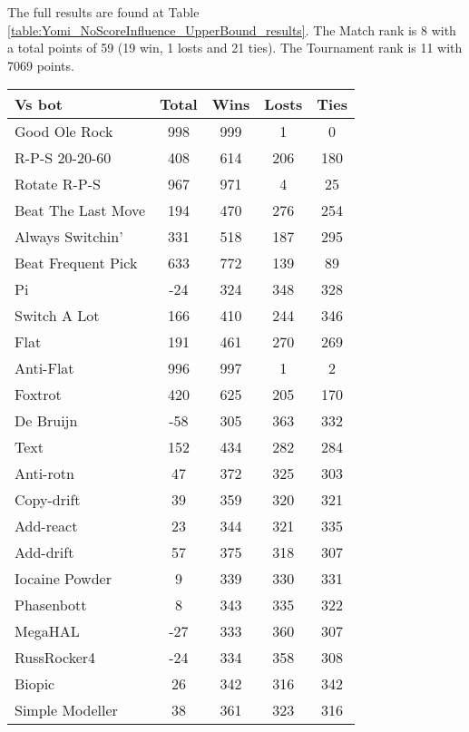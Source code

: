 The full results are found at Table \ref{table:Yomi_NoScoreInfluence_UpperBound_results}. The Match rank is 8 with a total points of 59 (19 win, 1 losts and 21 ties). The Tournament rank is 11 with 7069 points.

\begin{table*}
    \caption{Yomi No Score Influence Upper Bound results}
    \label{table:Yomi_NoScoreInfluence_UpperBound_results}
    \centering
    \begin{tabular}{|l|c|c|c|c|}
        \hline
        \textbf{Vs bot} & \textbf{Total} & \textbf{Wins} & \textbf{Losts} & \textbf{Ties} \\ \hline
Good Ole Rock & 998 & 999 & 1 & 0 \\ \hline 
R-P-S 20-20-60 & 408 & 614 & 206 & 180 \\ \hline 
Rotate R-P-S & 967 & 971 & 4 & 25 \\ \hline 
Beat The Last Move & 194 & 470 & 276 & 254 \\ \hline 
Always Switchin' & 331 & 518 & 187 & 295 \\ \hline 
Beat Frequent Pick & 633 & 772 & 139 & 89 \\ \hline 
Pi & -24 & 324 & 348 & 328 \\ \hline 
Switch A Lot & 166 & 410 & 244 & 346 \\ \hline 
Flat & 191 & 461 & 270 & 269 \\ \hline 
Anti-Flat & 996 & 997 & 1 & 2 \\ \hline 
Foxtrot & 420 & 625 & 205 & 170 \\ \hline 
De Bruijn & -58 & 305 & 363 & 332 \\ \hline 
Text & 152 & 434 & 282 & 284 \\ \hline 
Anti-rotn & 47 & 372 & 325 & 303 \\ \hline 
Copy-drift & 39 & 359 & 320 & 321 \\ \hline 
Add-react & 23 & 344 & 321 & 335 \\ \hline 
Add-drift & 57 & 375 & 318 & 307 \\ \hline 
Iocaine Powder & 9 & 339 & 330 & 331 \\ \hline 
Phasenbott & 8 & 343 & 335 & 322 \\ \hline 
MegaHAL & -27 & 333 & 360 & 307 \\ \hline 
RussRocker4 & -24 & 334 & 358 & 308 \\ \hline 
Biopic & 26 & 342 & 316 & 342 \\ \hline 
Simple Modeller & 38 & 361 & 323 & 316 \\ \hline 

\end{tabular}
\end{table*}
